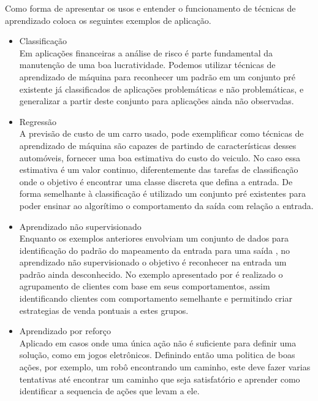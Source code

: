 \documentclass[
    12pt,
    oneside,
    a4paper,
    english,
    brazil
]{abntex2}
\begin{document}
Como forma  de apresentar  os usos  e entender o  funcionamento de  técnicas de
aprendizado  coloca os seguintes exemplos de aplicação.
\begin{itemize}
    \item Classificação\\
        Em aplicações  financeiras a  análise de risco  é parte  fundamental da
        manutenção  de  uma boa  lucratividade.  Podemos  utilizar técnicas  de
        aprendizado  de  máquina  para  reconhecer um  padrão  em  um  conjunto
        pré  existente  já  classificados  de aplicações  problemáticas  e  não
        problemáticas, e  generalizar a  partir deste conjunto  para aplicações
        ainda não observadas.
    \item Regressão\\
        A previsão de custo de um  carro usado, pode exemplificar como técnicas
        de aprendizado  de máquina são  capazes de partindo  de características
        desses automóveis,  fornecer uma  boa estimativa  do custo  do veiculo.
        No  caso  essa  estimativa  é um  valor  continuo,  diferentemente  das
        tarefas  de  classificação  onde  o objetivo  é  encontrar  uma  classe
        discreta que  defina a entrada.  De forma semelhante à  classificação é
        utilizado um conjunto pré existentes para poder ensinar ao algorítimo o
        comportamento da saída com relação a entrada.
    \item Aprendizado não supervisionado\\
        Enquanto os  exemplos anteriores  envolviam um  conjunto de  dados para
        identificação  do  padrão  do  mapeamento da  entrada  para  uma  saída
        ,  no  aprendizado  não  supervisionado  o  objetivo  é  reconhecer  na
        entrada  um  padrão  ainda  desconhecido. No  exemplo  apresentado  por
         é  realizado o agrupamento  de clientes com  base em
        seus  comportamentos, assim  identificando  clientes com  comportamento
        semelhante e  permitindo criar  estrategias de  venda pontuais  a estes
        grupos.
    \item Aprendizado por reforço\\
        Aplicado em casos onde uma única ação não é suficiente para definir uma
        solução, como  em jogos  eletrônicos. Definindo  então uma  politica de
        boas  ações, por  exemplo, um  robô encontrando  um caminho,  este deve
        fazer varias tentativas até encontrar  um caminho que seja satisfatório
        e aprender como identificar a sequencia de ações que levam a ele.
\end{itemize}
\end{document}
